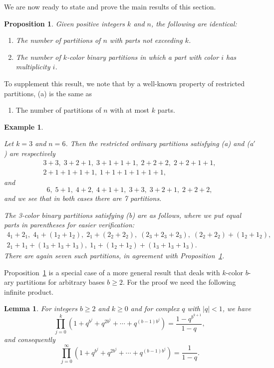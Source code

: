 \documentclass{amsart}
\theoremstyle{plain}
\newtheorem{example}[theorem]{Example}
\newtheorem{proposition}[theorem]{Proposition}
\newtheorem{lemma}[theorem]{Lemma}
\numberwithin{equation}{section}
\begin{document}
We are now ready to state and prove the main results of this section.

\begin{proposition}\label{prop:2.4}
Given positive integers $k$ and $n$, the following are identical:
\begin{enumerate}
\item[(a)] The number of partitions of $n$ with parts not exceeding $k$.
\item[(b)] The number of $k$-color binary partitions in which a part with
color $i$ has multiplicity $i$.
\end{enumerate}
\end{proposition}

To supplement this result, we note that by a well-known property of restricted
partitions, (a) is the same as
\begin{enumerate}
\item[(a$'$)] The number of partitions of $n$ with at most $k$ parts.
\end{enumerate}

\begin{example}\label{ex:2.5}
{\rm Let $k=3$ and $n=6$. Then the restricted ordinary partitions satisfying
(a) and (a$'$) are respectively
\begin{gather*}
3+3,\;3+2+1,\;3+1+1+1,\;2+2+2,\;2+2+1+1,\\
2+1+1+1+1,\;1+1+1+1+1+1,
\end{gather*}
and
\[
6,\;5+1,\;4+2,\;4+1+1,\;3+3,\;3+2+1,\;2+2+2,
\]
and we see that in both cases there are 7 partitions.

The 3-color binary partitions satisfying (b) are as follows, where we put
equal parts in parentheses for easier verification:
\begin{gather*}
4_1+2_1,\; 4_1+(1_2+1_2),\; 2_1+(2_2+2_2),\; (2_3+2_3+2_3),\; 
(2_2+2_2)+(1_2+1_2),\\
 2_1+1_1+(1_3+1_3+1_3),\; 1_1+(1_2+1_2)+(1_3+1_3+1_3).
\end{gather*}
There are again seven such partitions, in agreement with 
Proposition~\ref{prop:2.4}.}
\end{example}

Proposition~\ref{prop:2.4} is a special case of a more general result that 
deals with $k$-color $b$-ary partitions for arbitrary bases $b\geq 2$. For the
proof we need the following infinite product.

\begin{lemma}\label{lem:2.6}
For integers $b\geq 2$ and $k\geq 0$ and for complex $q$ with $|q|<1$, we have
\begin{equation}\label{2.3}
\prod_{j=0}^k\left(1+q^{b^j}+q^{2b^j}+\cdots+q^{(b-1)b^j}\right)
=\frac{1-q^{b^{k+1}}}{1-q},
\end{equation}
and consequently
\begin{equation}\label{2.4}
\prod_{j=0}^\infty\left(1+q^{b^j}+q^{2b^j}+\cdots+q^{(b-1)b^j}\right)
=\frac{1}{1-q}.
\end{equation}
\end{lemma}
\end{document}
